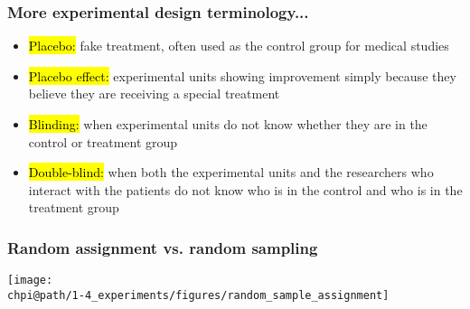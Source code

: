 \documentclass[slidestop,compress,mathserif]{beamer}
\makeatletter
\def\chpi@path{../../Chp 1}  %
\makeatother
\begin{document}
\begin{frame}
	\frametitle{More experimental design terminology...}

	\begin{itemize}
		\item \hl{Placebo:} fake treatment, often used as the control group for medical studies
		\item \hl{Placebo effect:} experimental units showing improvement simply because they believe they are receiving a special treatment
		\item \hl{Blinding:} when experimental units do not know whether they are in the control or treatment group
		\item \hl{Double-blind:} when both the experimental units and the researchers who interact with the patients do not know who is in the control and who is in the treatment group

	\end{itemize}

\end{frame}







\begin{frame}
	\frametitle{Random assignment vs. random sampling}

	\begin{center}
	\texttt{[image: \\chpi@path/1-4\_experiments/figures/random\_sample\_assignment]}
	\end{center}

\end{frame}
\end{document}
